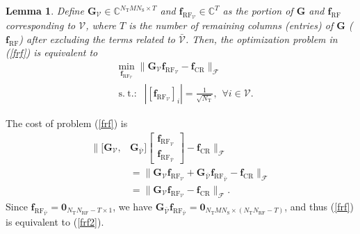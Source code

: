 \documentclass[journal,10pt]{IEEEtran}
\newtheorem{lemma}[theorem]{Lemma}
\DeclareMathOperator*{\subjectto}{s.\hspace{3pt} t.:\hspace{3pt}} %
\begin{document}
	\begin{lemma} 
		\label{lem:sol1}
		Define  $\mathbf{G}_\mathcal{V}\in \mathbb{C}^{N_\mathrm{T}MN_\mathrm{S}\times T}$ and $\mathbf{f}_{\mathrm{RF}_\mathcal{V}}\in \mathbb{C}^{T}$ as the portion of $\mathbf{G}$ and $\mathbf{f}_\mathrm{RF}$ corresponding to ${\mathcal{V}}$, where $T$ is the number of remaining columns (entries) of $\mathbf{G}$ ($\mathbf{f}_\mathrm{RF}$) after excluding the terms related to $\bar{\mathcal{V}}$. Then, the optimization problem in (\ref{frf}) is equivalent to
		\begin{align}
		\label{frf2}
		&\min_{\mathbf{f}_{\mathrm{RF}_\mathcal{V}}}  \|\mathbf{G}_\mathcal{V}\mathbf{f}_{\mathrm{RF}_\mathcal{V}} -\mathbf{f}_\mathrm{CR} \|_\mathcal{F}  \nonumber \\
		&\subjectto \hspace{3pt} |[\mathbf{f}_{\mathrm{RF}_\mathcal{V}}]_{i}| = \frac{1}{\sqrt{N_\mathrm{T}}}, \hspace{5pt} \forall i \in \mathcal{V}.
		\end{align}
	\end{lemma}
	\begin{IEEEproof} The cost of problem (\ref{frf}) is
		\begin{align}
		\label{frfMod}
		\|[\mathbf{G}_\mathcal{V},  &\mathbf{G}_{\bar{\mathcal{V}}}]        \left[ \begin{array}{c}
		\mathbf{f}_{\mathrm{RF}_\mathcal{V}}\\
		\mathbf{f}_{\mathrm{RF}_{\bar{\mathcal{V}}}}
		\end{array}\right] - 
		\mathbf{f}_\mathrm{CR}
		\|_\mathcal{F} \nonumber \\
		&=  \|
		\mathbf{G}_\mathcal{V}\mathbf{f}_{\mathrm{RF}_\mathcal{V}} +
		\mathbf{G}_{\bar{\mathcal{V}}}\mathbf{f}_{\mathrm{RF}_{\bar{\mathcal{V}}}}  - \mathbf{f}_\mathrm{CR} \|_\mathcal{F}\nonumber\\
		& =  \|
		\mathbf{G}_\mathcal{V}\mathbf{f}_{\mathrm{RF}_\mathcal{V}} -\mathbf{f}_\mathrm{CR}   \|_\mathcal{F}.
		\end{align}
		Since  $\mathbf{f}_{\mathrm{RF}_{\bar{\mathcal{V}}}}= \mathbf{0}_{N_\mathrm{T}N_\mathrm{RF}-T\times 1}$, we have $\mathbf{G}_{\bar{\mathcal{V}}} \mathbf{f}_{\mathrm{RF}_{\bar{\mathcal{V}}}} = \mathbf{0}_{N_\mathrm{T}MN_\mathrm{S}\times (N_\mathrm{T}N_\mathrm{RF} - T)}$, and thus (\ref{frf}) is equivalent to (\ref{frf2}). 
	\end{IEEEproof}
	
\end{document}

